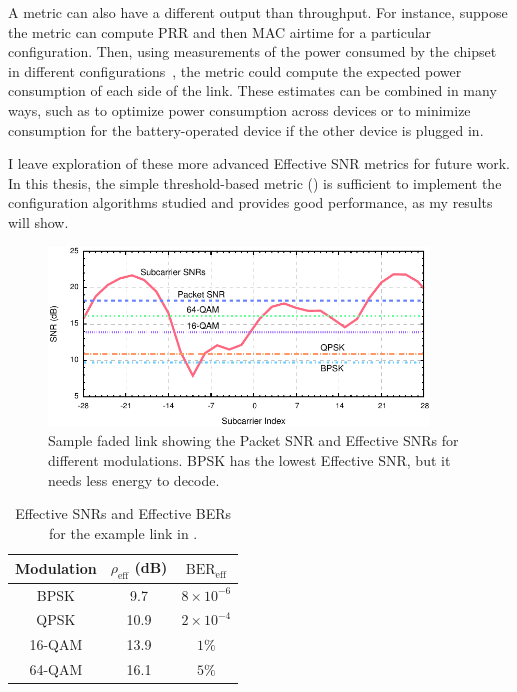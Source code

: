 A metric can also have a different output than throughput. For instance, suppose the metric can compute PRR and then MAC airtime for a particular configuration. Then, using measurements of the power consumed by the chipset in different configurations~\cite{Halperin_Power}, the metric could compute the expected power consumption of each side of the link. These estimates can be combined in many ways, such as to optimize power consumption across devices or to minimize consumption for the battery-operated device if the other device is plugged in.

I leave exploration of these more advanced Effective SNR metrics for future work. In this thesis, the simple threshold-based metric () is sufficient to implement the configuration algorithms studied and provides good performance, as my results will show.

\begin{figure}[t]
  \centering
  \includegraphics[width=0.9\textwidth]{figures/model/eff_snr_example.pdf}
  \caption[Packet SNR and Effective SNRs for a sample faded link]{Sample faded link showing the Packet SNR and Effective SNRs for different modulations. BPSK has the lowest Effective SNR, but it needs less energy to decode.}
  \label{fig:eff_example}
\end{figure}

\begin{table}[t]
	\centering
	\begin{tabular}{ccc}
	\toprule%
	Modulation & $\rho_\text{eff}$ (dB) & $\text{BER}_\text{eff}$\\
	\midrule%
	BPSK   &  9.7 & $8\times10^{-6}$\\
	QPSK   & 10.9 & $2\times10^{-4}$\\
	16-QAM & 13.9 & $1\%$\\
	64-QAM & 16.1 & $5\%$\\
	\bottomrule
	\end{tabular}
	\caption[Effective SNRs and Effective BERs for the example link in ]{\label{tab:example_bers}Effective SNRs and Effective BERs for the example link in .}
\end{table}

